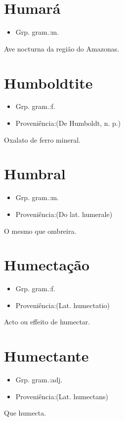 \documentclass{article}
\begin{document}
\section{Humará}
\begin{itemize}
\item {Grp. gram.:m.}
\end{itemize}
Ave nocturna da região do Amazonas.
\section{Humboldtite}
\begin{itemize}
\item {Grp. gram.:f.}
\end{itemize}
\begin{itemize}
\item {Proveniência:(De \textunderscore Humboldt\textunderscore , n. p.)}
\end{itemize}
Oxalato de ferro mineral.
\section{Humbral}
\begin{itemize}
\item {Grp. gram.:m.}
\end{itemize}
\begin{itemize}
\item {Proveniência:(Do lat. \textunderscore humerale\textunderscore )}
\end{itemize}
O mesmo que \textunderscore ombreira\textunderscore .
\section{Humectação}
\begin{itemize}
\item {Grp. gram.:f.}
\end{itemize}
\begin{itemize}
\item {Proveniência:(Lat. \textunderscore humectatio\textunderscore )}
\end{itemize}
Acto ou effeito de humectar.
\section{Humectante}
\begin{itemize}
\item {Grp. gram.:adj.}
\end{itemize}
\begin{itemize}
\item {Proveniência:(Lat. \textunderscore humectans\textunderscore )}
\end{itemize}
Que humecta.
\end{document}
